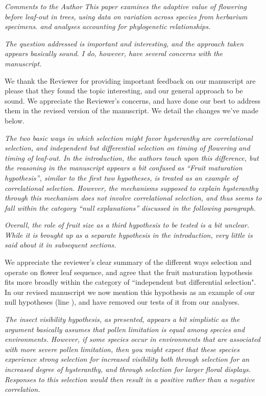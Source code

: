 \documentclass{article}[12pt]
\begin{document}
\emph{Comments to the Author}
\emph{This paper examines the adaptive value of flowering before leaf-out in trees, using data on variation across species from herbarium specimens. and analyses accounting for phylogenetic relationships.}

\emph{The question addressed is important and interesting, and the approach taken appears basically sound. I do, however, have several concerns with the manuscript.}

We thank the Reviewer for providing important feedback on our manuscript are please that they found the topic interesting, and our general approach to be sound. We appreciate the  Reviewer's concerns, and have done our best to address them in the revised version of the manuscript. We detail the changes we've made below.

\emph{The two basic ways in which selection might favor hysteranthy are correlational selection, and independent but differential selection on timing of flowering and timing of leaf-out. In the introduction, the authors touch upon this difference, but the reasoning in the manuscript appears a bit confused as “Fruit maturation hypothesis”, similar to the first two hypotheses, is treated as an example of correlational selection. However, the mechanisms supposed to explain hysteranthy through this mechanism does not involve correlational selection, and thus seems to fall within the category “null explanations” discussed in the following paragraph.}

\emph{Overall, the role of fruit size as a third hypothesis to be tested is a bit unclear. While it is brought up as a separate hypothesis in the introduction, very little is said about it in subsequent sections.}

We appreciate the reviewer's clear summary of the different ways selection and operate on flower leaf sequence, and agree that the fruit maturation hypothesis fits more broadly within the category of ``independent but differential selection".  In our revised manuscript we now mention this hypothesis as an example of our null hypotheses (line ), and have removed our tests of it from our analyses. 

\emph{The insect visibility hypothesis, as presented, appears a bit simplistic as the argument basically assumes that pollen limitation is equal among species and environments. However, if some species occur in environments that are associated with more severe pollen limitation, then you might expect that these species experience strong selection for increased visibility both through selection for an increased degree of hysteranthy, and through selection for larger floral displays. Responses to this selection would then result in a positive rather than a negative correlation.}
\end{document}
